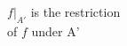 \documentclass[preview]{standalone}
\begin{document}
\begin{center}
$f|_{A'}$ is the restriction\\of $f$ under A'
\end{center}
\end{document}
